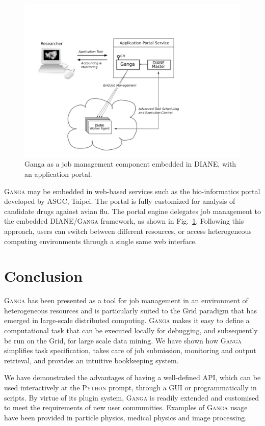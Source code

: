 \documentclass{elsart}
\def\ganga {\textsc{Ganga}\xspace}
\def\python {\textsc{Python}\xspace}
\def\diane {\textsc{DIANE}\xspace}
\def\grid {Grid\xspace}
\begin{document}
\begin{figure}[h!]
  \centering
  \includegraphics[width=1 \textwidth]{ganga-diane-portal.pdf}
  \caption{Ganga as a job management component embedded in DIANE,
    with an application portal.}
  \label{fig:webportal}
\end{figure}
\ganga may be embedded in web-based services such as the
bio-informatics portal developed by ASGC, Taipei. The portal is fully
customized for analysis of candidate drugs against avian flu.  The portal
engine delegates
job management to the embedded \diane/\ganga framework, as shown in
Fig.~\ref{fig:webportal}. Following this approach, users can
switch between different resources, or access heterogeneous computing environments
through a single same web interface.

\section{Conclusion}
\label{sec:conclusion}
\ganga has been presented as a tool for job management in an environment of heterogeneous resources
and is particularly suited to the \grid paradigm that has emerged in large-scale distributed computing.
\ganga makes it easy to define a
computational task that can be executed locally for debugging, and
subsequently be run on the \grid, for large scale data mining. We have shown how \ganga
simplifies task specification, takes care of job submission, monitoring and
output retrieval, and provides an intuitive bookkeeping system.

We have demonstrated the advantages of having a well-defined API, which can be
used interactively at the \python prompt, through a GUI or
programmatically in scripts. By virtue of its plugin system, \ganga is readily
extended and customised to meet the requirements of new user communities.
Examples of \ganga usage have been provided in particle physics,
medical physics and image processing.
\end{document}
